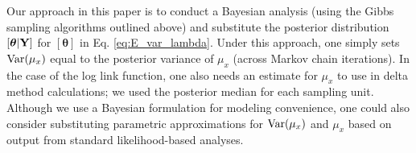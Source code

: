 \documentclass[12pt,fleqn]{article}
\begin{document}
\begin{flushleft}
\hspace{.5in} Our approach in this paper is to conduct a Bayesian analysis (using the Gibbs sampling algorithms outlined above) and substitute the posterior distribution $[\boldsymbol{\theta}|{\bf Y}]$ for $[\boldsymbol{\theta}]$ in Eq. \ref{eq:E_var_lambda}. Under this approach, one simply sets ${\rm Var}(\mu_x)$ equal to the posterior variance of $\mu_x$ (across Markov chain iterations).  In the case of the log link function, one also needs an estimate for $\mu_x$ to use in delta method calculations; we used the posterior median for each sampling unit.  Although we use a Bayesian formulation for modeling convenience, one could also consider substituting parametric approximations for ${\rm Var}(\mu_x)$ and $\mu_x$ based on output from standard likelihood-based analyses.


\renewcommand{\refname}{Literature Cited}




\end{flushleft}
\end{document}
